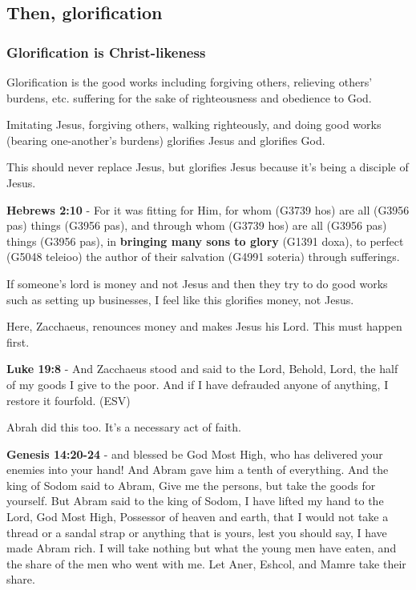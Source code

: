 \documentclass[11pt]{article}
\begin{document}
\subsection{Then, glorification}
\label{sec:orgf686250}
\subsubsection{Glorification is Christ-likeness}
\label{sec:org168744c}
Glorification is the good works including forgiving others, relieving others' burdens, etc. suffering for the sake of righteousness and obedience to God.

Imitating Jesus, forgiving others, walking righteously, and doing good works (bearing one-another's burdens) glorifies Jesus and glorifies God.

This should never replace Jesus, but glorifies Jesus because it's being a disciple of Jesus.

\textbf{Hebrews 2:10} - For it was fitting for Him, for whom (G3739 hos) are all (G3956 pas) things (G3956 pas), and through whom (G3739 hos) are all (G3956 pas) things (G3956 pas), in \textbf{bringing many sons to glory} (G1391 doxa), to perfect (G5048 teleioo) the author of their salvation (G4991 soteria) through sufferings.

If someone's lord is money and not Jesus and then they try to do good works such as setting up businesses, I feel like this glorifies money, not Jesus.

Here, Zacchaeus, renounces money and makes Jesus his Lord. This must happen first.

\textbf{Luke 19:8} - And Zacchaeus stood and said to the Lord, Behold, Lord, the half of my goods I give to the poor.  And if I have defrauded anyone of anything, I restore it fourfold.  (ESV)

Abrah did this too. It's a necessary act of faith.

\textbf{Genesis 14:20-24} - and blessed be God Most High, who has delivered your enemies into your hand! And Abram gave him a tenth of everything. And the king of Sodom said to Abram, Give me the persons, but take the goods for yourself. But Abram said to the king of Sodom, I have lifted my hand to the Lord, God Most High, Possessor of heaven and earth, that I would not take a thread or a sandal strap or anything that is yours, lest you should say, I have made Abram rich. I will take nothing but what the young men have eaten, and the share of the men who went with me. Let Aner, Eshcol, and Mamre take their share.
\end{document}

